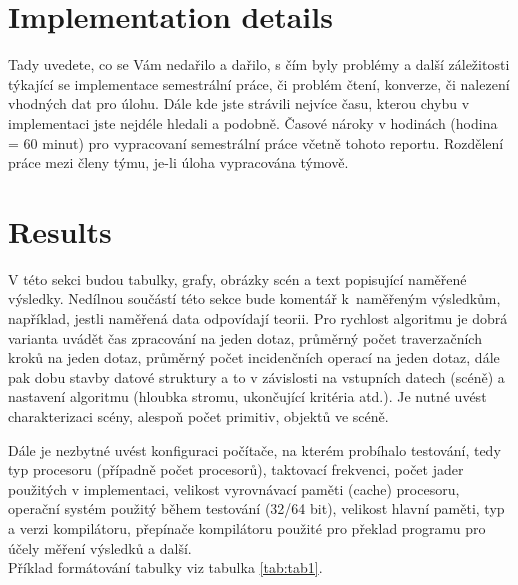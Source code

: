\documentclass[report,11pt]{elsarticle}
\begin{document}
\section{\label{SEC:Pitfalls}Implementation details}

Tady uvedete, co se Vám nedařilo a dařilo, s čím byly problémy a další
záležitosti týkající se implementace semestrální práce, či problém
čtení, konverze, či nalezení vhodných dat pro úlohu. Dále kde jste
strávili nejvíce času, kterou chybu v implementaci jste nejdéle
hledali a podobně. Časové nároky v hodinách (hodina = 60 minut) pro
vypracovaní semestrální práce včetně tohoto reportu. Rozdělení práce
mezi členy týmu, je-li úloha vypracována týmově.

\section{\label{SEC:Results}Results}

V této sekci budou tabulky, grafy, obrázky scén a text popisující
naměřené výsledky. Nedílnou součástí této sekce bude komentář
k~naměřeným výsledkům, například, jestli naměřená data odpovídají
teorii. Pro rychlost algoritmu je dobrá varianta uvádět čas zpracování
na jeden dotaz, průměrný počet traverzačních kroků na jeden dotaz,
průměrný počet incidenčních operací na jeden dotaz, dále pak dobu
stavby datové struktury a to v závislosti na vstupních datech (scéně)
a nastavení algoritmu (hloubka stromu, ukončující kritéria atd.). Je
nutné uvést charakterizaci scény, alespoň počet primitiv, objektů ve
scéně.

Dále je nezbytné uvést konfiguraci počítače, na kterém probíhalo
testování, tedy typ procesoru (případně počet procesorů), taktovací
frekvenci, počet jader použitých v implementaci, velikost vyrovnávací
paměti (cache) procesoru, operační systém použitý během testování
(32/64 bit), velikost hlavní paměti, typ a verzi kompilátoru,
přepínače kompilátoru použité pro překlad programu pro účely měření
výsledků a další.\\

Příklad formátování tabulky viz tabulka \ref{tab:tab1}.
\end{document}
